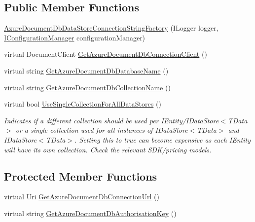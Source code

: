 \subsection*{Public Member Functions}
\begin{DoxyCompactItemize}
\item 
\hyperlink{classCqrs_1_1Azure_1_1DocumentDb_1_1Factories_1_1AzureDocumentDbDataStoreConnectionStringFactory_a9b08d89df792a20e71f5278dbf39b804_a9b08d89df792a20e71f5278dbf39b804}{Azure\+Document\+Db\+Data\+Store\+Connection\+String\+Factory} (I\+Logger logger, \hyperlink{interfaceCqrs_1_1Configuration_1_1IConfigurationManager}{I\+Configuration\+Manager} configuration\+Manager)
\item 
virtual Document\+Client \hyperlink{classCqrs_1_1Azure_1_1DocumentDb_1_1Factories_1_1AzureDocumentDbDataStoreConnectionStringFactory_a0525c318c3930076e08ed83f9829ab2c_a0525c318c3930076e08ed83f9829ab2c}{Get\+Azure\+Document\+Db\+Connection\+Client} ()
\item 
virtual string \hyperlink{classCqrs_1_1Azure_1_1DocumentDb_1_1Factories_1_1AzureDocumentDbDataStoreConnectionStringFactory_a2a30d6066e2bc9c4af078b1f0a5407ab_a2a30d6066e2bc9c4af078b1f0a5407ab}{Get\+Azure\+Document\+Db\+Database\+Name} ()
\item 
virtual string \hyperlink{classCqrs_1_1Azure_1_1DocumentDb_1_1Factories_1_1AzureDocumentDbDataStoreConnectionStringFactory_a0685593d04e9a905d270800c278ddb42_a0685593d04e9a905d270800c278ddb42}{Get\+Azure\+Document\+Db\+Collection\+Name} ()
\item 
virtual bool \hyperlink{classCqrs_1_1Azure_1_1DocumentDb_1_1Factories_1_1AzureDocumentDbDataStoreConnectionStringFactory_aa7b4b3eca609a815358af227b0f53909_aa7b4b3eca609a815358af227b0f53909}{Use\+Single\+Collection\+For\+All\+Data\+Stores} ()
\begin{DoxyCompactList}\small\item\em Indicates if a different collection should be used per I\+Entity/I\+Data\+Store$<$\+T\+Data$>$ or a single collection used for all instances of I\+Data\+Store$<$\+T\+Data$>$ and I\+Data\+Store$<$\+T\+Data$>$. Setting this to true can become expensive as each I\+Entity will have it\textquotesingle{}s own collection. Check the relevant S\+D\+K/pricing models. \end{DoxyCompactList}\end{DoxyCompactItemize}
\subsection*{Protected Member Functions}
\begin{DoxyCompactItemize}
\item 
virtual Uri \hyperlink{classCqrs_1_1Azure_1_1DocumentDb_1_1Factories_1_1AzureDocumentDbDataStoreConnectionStringFactory_af5d090f6195c7b59183db1eec8dcafc0_af5d090f6195c7b59183db1eec8dcafc0}{Get\+Azure\+Document\+Db\+Connection\+Url} ()
\item 
virtual string \hyperlink{classCqrs_1_1Azure_1_1DocumentDb_1_1Factories_1_1AzureDocumentDbDataStoreConnectionStringFactory_a794c6926a7b29f927d41a0160716972a_a794c6926a7b29f927d41a0160716972a}{Get\+Azure\+Document\+Db\+Authorisation\+Key} ()
\end{DoxyCompactItemize}
